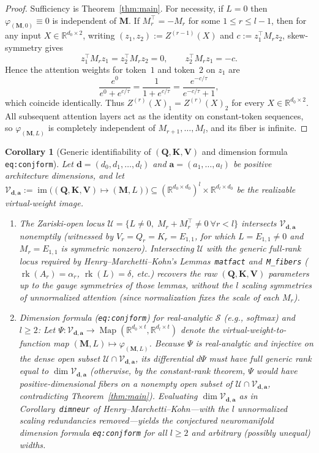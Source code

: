 \documentclass[11pt]{article}
\theoremstyle{plain}
\newtheorem{corollary}{Corollary}
\theoremstyle{definition}
\theoremstyle{remark}
\DeclareMathOperator{\im}{im}
\DeclareMathOperator{\rk}{rk}
\DeclareMathOperator{\Map}{Map}
\newcommand{\R}{\mathbb{R}}
\newcommand{\calS}{\mathcal{S}}
\newcommand{\calU}{\mathcal{U}}
\newcommand{\calV}{\mathcal{V}}
\newcommand{\bfM}{\mathbf{M}}
\newcommand{\bfQ}{\mathbf{Q}}
\newcommand{\bfK}{\mathbf{K}}
\newcommand{\bfV}{\mathbf{V}}
\newcommand{\bfd}{\mathbf{d}}
\newcommand{\bfa}{\mathbf{a}}
\begin{document}
\begin{proof}
Sufficiency is Theorem~\ref{thm:main}. For necessity, if $L = 0$ then $\varphi_{(\bfM, 0)} \equiv 0$ is independent of $\bfM$. If $M_r^\top = -M_r$ for some $1 \le r \le l - 1$, then for any input $X \in \R^{d_0 \times 2}$, writing $(z_1, z_2) := Z^{(r-1)}(X)$ and $c := z_1^\top M_r z_2$, skew-symmetry gives
\[
z_1^\top M_r z_1 = z_2^\top M_r z_2 = 0, \qquad z_2^\top M_r z_1 = -c.
\]
Hence the attention weights for token~$1$ and token~$2$ on $z_1$ are
\[
\frac{e^{0}}{e^{0} + e^{c/\tau}} = \frac{1}{1 + e^{c/\tau}} = \frac{e^{-c/\tau}}{e^{-c/\tau} + 1},
\]
which coincide identically. Thus $Z^{(r)}(X)_1 = Z^{(r)}(X)_2$ for every $X \in \R^{d_0 \times 2}$. All subsequent attention layers act as the identity on constant-token sequences, so $\varphi_{(\bfM, L)}$ is completely independent of $M_{r+1}, \dots, M_l$, and its fiber is infinite.
\end{proof}

\begin{corollary}[Generic identifiability of $(\bfQ, \bfK, \bfV)$ and dimension formula \texttt{eq:conjform}]\label{cor:dim}
Let $\bfd = (d_0, d_1, \dots, d_l)$ and $\bfa = (a_1, \dots, a_l)$ be positive architecture dimensions, and let $\calV_{\bfd,\bfa} := \im\bigl((\bfQ, \bfK, \bfV) \mapsto (\bfM, L)\bigr) \subseteq (\R^{d_0 \times d_0})^l \times \R^{d_l \times d_0}$ be the realizable virtual-weight image.
\begin{enumerate}[label=(\arabic*),leftmargin=2.2em,itemsep=2pt]
    \item The Zariski-open locus $\calU = \{L \neq 0,\; M_r + M_r^\top \neq 0\ \forall r < l\}$ intersects $\calV_{\bfd,\bfa}$ nonemptily (witnessed by $V_r = Q_r = K_r = E_{1,1}$, for which $L = E_{1,1} \neq 0$ and $M_r = E_{1,1}$ is symmetric nonzero). Intersecting $\calU$ with the generic full-rank locus required by Henry--Marchetti--Kohn's Lemmas~\texttt{matfact} and~\texttt{M\_fibers} ($\rk(A_r) = \alpha_r$, $\rk(L) = \delta$, etc.) recovers the raw $(\bfQ, \bfK, \bfV)$ parameters up to the gauge symmetries of those lemmas, \emph{without} the $l$ scaling symmetries of unnormalized attention (since normalization fixes the scale of each $M_r$).
    \item \emph{Dimension formula (\texttt{eq:conjform}) for real-analytic $\calS$ (e.g., softmax) and $l \ge 2$:} Let $\Psi : \calV_{\bfd,\bfa} \to \Map(\R^{d_0 \times t}, \R^{d_l \times t})$ denote the virtual-weight-to-function map $(\bfM, L) \mapsto \varphi_{(\bfM, L)}$. Because $\Psi$ is real-analytic and injective on the dense open subset $\calU \cap \calV_{\bfd,\bfa}$, its differential $d\Psi$ must have full generic rank equal to $\dim \calV_{\bfd,\bfa}$ (otherwise, by the constant-rank theorem, $\Psi$ would have positive-dimensional fibers on a nonempty open subset of $\calU \cap \calV_{\bfd,\bfa}$, contradicting Theorem~\ref{thm:main}). Evaluating $\dim \calV_{\bfd,\bfa}$ as in Corollary~\texttt{dimneur} of Henry--Marchetti--Kohn---with the $l$ unnormalized scaling redundancies removed---yields the conjectured neuromanifold dimension formula \texttt{eq:conjform} for all $l \ge 2$ and arbitrary (possibly unequal) widths.
\end{enumerate}
\end{corollary}
\end{document}
